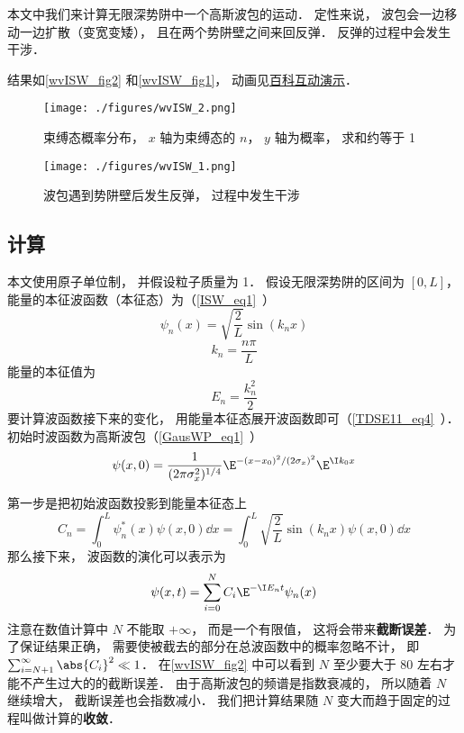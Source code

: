 

本文中我们来计算无限深势阱中一个高斯波包的运动． 定性来说， 波包会一边移动一边扩散（变宽变矮）， 且在两个势阱壁之间来回反弹． 反弹的过程中会发生干涉．

结果如\autoref{wvISW_fig2} 和\autoref{wvISW_fig1}， 动画见\href{https://wuli.wiki/apps/wvISW.html}{百科互动演示}．

\begin{figure}[ht]
\centering
\texttt{[image: ./figures/wvISW\_2.png]}
\caption{束缚态概率分布， $x$ 轴为束缚态的 $n$， $y$ 轴为概率， 求和约等于 1} \label{wvISW_fig2}
\end{figure}

\begin{figure}[ht]
\centering
\texttt{[image: ./figures/wvISW\_1.png]}
\caption{波包遇到势阱壁后发生反弹， 过程中发生干涉} \label{wvISW_fig1}
\end{figure}

\subsection{计算}

本文使用原子单位制， 并假设粒子质量为 1． 假设无限深势阱的区间为 $[0, L]$， 能量的本征波函数（本征态）为（\autoref{ISW_eq1}~）
\begin{equation}
\psi _n(x) = \sqrt{\frac{2}{L}} \sin(k_n x)
\end{equation}
\begin{equation}
k_n = \frac{n\pi }{L}
\end{equation}
能量的本征值为
\begin{equation}
E_n = \frac{k_n^2}{2}
\end{equation}
要计算波函数接下来的变化， 用能量本征态展开波函数即可（\autoref{TDSE11_eq4}~）． 初始时波函数为高斯波包（\autoref{GausWP_eq1}~）
\begin{equation}
\psi (x,0) = \frac{1}{(2\pi \sigma _x ^2)^{1/4}} \E^{-(x - x_0)^2/(2\sigma _x)^2} \E^{\I k_0x}
\end{equation}

第一步是把初始波函数投影到能量本征态上
\begin{equation}\label{wvISW_eq1}
C_n = \int_0^L \psi _n^*(x) \psi (x,0) \dd{x}
= \int_0^L \sqrt{\frac{2}{L}} \sin(k_n x) \psi (x,0) \dd{x}
\end{equation}
那么接下来， 波函数的演化可以表示为
\begin{equation}\label{wvISW_eq2}
\psi (x,t) = \sum _{i=0}^N C_i \E^{-\I E_n t} \psi _n(x)
\end{equation}
注意在数值计算中 $N$ 不能取 $+\infty$， 而是一个有限值， 这将会带来\textbf{截断误差}． 为了保证结果正确， 需要使被截去的部分在总波函数中的概率忽略不计， 即 $\sum_{i=N+1}^\infty \abs{C_i}^2 \ll 1$． 在\autoref{wvISW_fig2} 中可以看到 $N$ 至少要大于 80 左右才能不产生过大的的截断误差． 由于高斯波包的频谱是指数衰减的， 所以随着 $N$ 继续增大， 截断误差也会指数减小． 我们把计算结果随 $N$ 变大而趋于固定的过程叫做计算的\textbf{收敛}．

